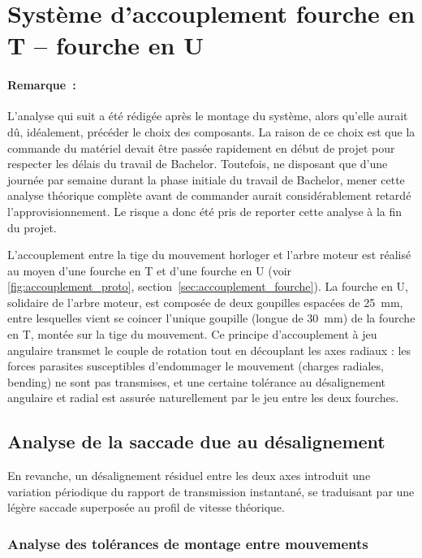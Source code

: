 \section{Système d'accouplement fourche en T -- fourche en U}
\label{sec:dim-accouplement}

\paragraph{Remarque~:} L'analyse qui suit a été rédigée après le montage du
système, alors qu'elle aurait dû, idéalement, précéder le choix des
composants. La raison de ce choix est que la commande du matériel devait être passée rapidement
en début de projet pour respecter les délais du travail de Bachelor. Toutefois, ne
disposant que d'une journée par semaine durant la phase initiale du travail de Bachelor, mener
cette analyse théorique complète avant de commander aurait considérablement
retardé l'approvisionnement. Le risque a donc été pris de reporter cette analyse à la fin du projet.

L'accouplement entre la tige du mouvement horloger et l'arbre moteur est réalisé au moyen d'une fourche en T et d'une fourche en U (voir \autoref{fig:accouplement_proto}, section~\ref{sec:accouplement_fourche}).
La fourche en U, solidaire de l'arbre moteur, est composée de deux goupilles espacées de 25~mm, entre lesquelles vient se coincer l'unique goupille (longue de 30~mm) de la fourche en T, montée sur la tige du mouvement.
Ce principe d'accouplement à jeu angulaire transmet le couple de rotation tout en découplant les axes radiaux : les forces parasites susceptibles d'endommager le mouvement (charges radiales, bending) ne sont pas transmises, et une certaine tolérance au désalignement angulaire et radial est assurée naturellement par le jeu entre les deux fourches.

\subsection{Analyse de la saccade due au désalignement}

En revanche, un désalignement résiduel entre les deux axes introduit une variation périodique du rapport de transmission instantané, se traduisant par une légère saccade superposée au profil de vitesse théorique.

\subsubsection{Analyse des tolérances de montage entre mouvements}

